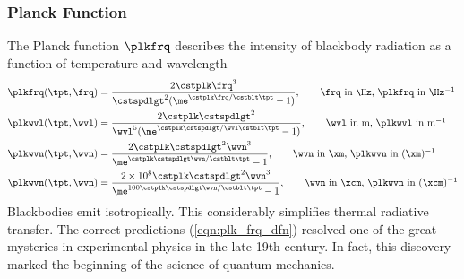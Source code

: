 \documentclass[12pt]{article}
\begin{document}
\subsubsection[Planck Function]{Planck Function}\label{sxn:plk_fnc}
The Planck function $\plkfrq$ describes the intensity of blackbody
radiation as a function of temperature and wavelength
\begin{subequations}
\label{eqn:plk_dfn}
\begin{align}
\label{eqn:plk_frq_dfn}
\plkfrq(\tpt,\frq) & = \frac{2 \cstplk \frq^{3}}
       {\cstspdlgt^{2}( \me^{\cstplk \frq / \cstblt \tpt} - 1)},
       \qquad \mbox{\frq\ in \Hz, \plkfrq\ in \Hz$^{-1}$} \\
\label{eqn:plk_wvl_dfn}
\plkwvl(\tpt,\wvl) & = \frac{2 \cstplk \cstspdlgt^{2}}
       {\wvl^{5} ( \me^{\cstplk \cstspdlgt / \wvl \cstblt \tpt} - 1)},
       \qquad \mbox{\wvl\ in m, \plkwvl\ in m$^{-1}$} \\ 
\label{eqn:plk_wvn_dfn}
\plkwvn(\tpt,\wvn) & = \frac{2 \cstplk \cstspdlgt^{2} \wvn^{3}}
       {\me^{\cstplk \cstspdlgt \wvn / \cstblt \tpt} - 1},
       \qquad \mbox{\wvn\ in \xm, \plkwvn\ in (\xm)$^{-1}$} \\
\label{eqn:plk_wvn_cgs_dfn}
\plkwvn(\tpt,\wvn) & = \frac{2 \times 10^{8} \cstplk \cstspdlgt^{2} \wvn^{3}}
       {\me^{100 \cstplk \cstspdlgt \wvn / \cstblt \tpt} - 1},
       \qquad \mbox{\wvn\ in \xcm, \plkwvn\ in (\xcm)$^{-1}$}
\end{align}
\end{subequations}
Blackbodies emit isotropically.
This considerably simplifies thermal radiative transfer. 
The correct predictions (\ref{eqn:plk_frq_dfn}) resolved one of the
great mysteries in experimental physics in the late 19th century.
In fact, this discovery marked the beginning of the science of quantum 
mechanics. 
\end{document}

